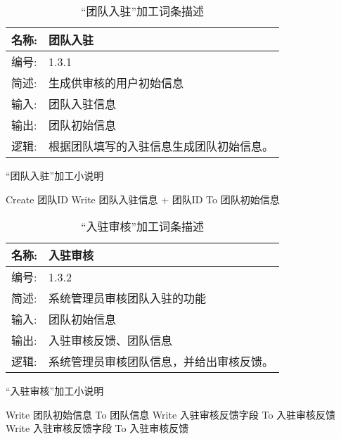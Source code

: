 \begin{table}[H]  
\caption{“团队入驻”加工词条描述}  
\begin{center}  
    \begin{tabular}{l p{11cm}} 
        \hline
        \quad 名称:  &   团队入驻 \\
        \hline
        \quad 编号:  & 1.3.1 \\
        \hline
        \quad 简述:  & 生成供审核的用户初始信息 \\
        \hline
        \quad 输入:  & 团队入驻信息 \\
        \hline
        \quad 输出:  & 团队初始信息\\
        \hline
        \quad 逻辑:  & 根据团队填写的入驻信息生成团队初始信息。 \\
        \hline
    \end{tabular}
    \label{tab1}
\end{center}
\end{table}

\begin{algorithm}[H]
    \renewcommand{\thealgorithm}{}
    \caption{“团队入驻”加工小说明} 
    \label{alg3} 
    \begin{algorithmic}[1]
        \STATE Create 团队ID
        \STATE Write 团队入驻信息 + 团队ID To 团队初始信息
    \end{algorithmic} 
\end{algorithm}

\begin{table}[H]  
\caption{“入驻审核”加工词条描述}  
\begin{center}  
    \begin{tabular}{l p{11cm}} 
        \hline
        \quad 名称:  &   入驻审核 \\
        \hline
        \quad 编号:  & 1.3.2 \\
        \hline
        \quad 简述:  & 系统管理员审核团队入驻的功能 \\
        \hline
        \quad 输入:  & 团队初始信息 \\
        \hline
        \quad 输出:  & 入驻审核反馈、团队信息 \\
        \hline
        \quad 逻辑:  & 系统管理员审核团队信息，并给出审核反馈。 \\
        \hline
    \end{tabular}
    \label{tab1}
\end{center}
\end{table}

\begin{algorithm}[H]
    \renewcommand{\thealgorithm}{}
    \caption{“入驻审核”加工小说明} 
    \label{alg3} 
    \begin{algorithmic}[1]
        \STATE Write 团队初始信息 To 团队信息
        \STATE Write 入驻审核反馈字段  To 入驻审核反馈
        \ELSE
        \STATE Write 入驻审核反馈字段 To 入驻审核反馈 
        \ENDIF 
    \end{algorithmic} 
\end{algorithm}

